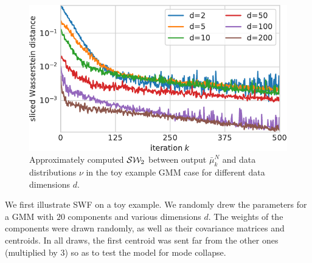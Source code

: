 \begin{figure}
\begin{centering}
\includegraphics[width=0.42\columnwidth]{figures/SW2_cost-crop.pdf}
\par\end{centering}
\caption{Approximately computed ${\cal S}{\cal W}_2$ between output $\bar{\mu}_{k}^{N}$ and data distributions $\nu$ in the toy example GMM case for different data dimensions $d$.
\label{fig:toy_sw}}
\end{figure}
We first illustrate SWF on a toy example. We randomly drew the parameters for a GMM with $20$ components and various dimensions $d$. The weights of the components were drawn randomly, as well as their covariance matrices and centroids. In all draws, the first centroid was sent far from the other ones (multiplied by $3$) so as to test the model for mode collapse.




